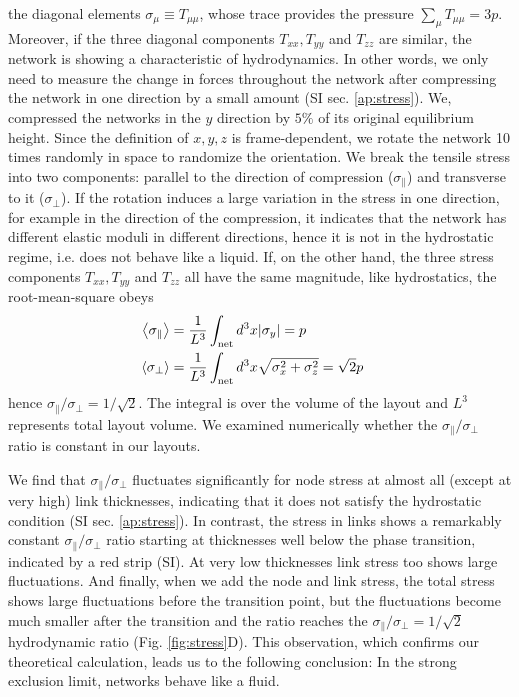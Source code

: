 \documentclass[nofootinbib,preprint,floatfix,titlepage,endfloats]{revtex4} %
\begin{document}
the  diagonal elements $ \sigma_\mu \equiv T_{\mu\mu}$, whose trace provides the pressure $\sum_\mu T_{\mu\mu} = 3p$. 
Moreover, if the three diagonal  components $T_{xx}, T_{yy}$ and $T_{zz}$ are similar, the network is showing a characteristic of hydrodynamics.
In other words, we only need to measure the change in forces throughout the network after compressing the network in one direction by a small amount (SI sec. \ref{ap:stress}). 
We, compressed the networks in the $y$ direction by $5\%$ 
of its original equilibrium height. 
Since the definition of $x,y,z$ is frame-dependent, we rotate the network 10 times randomly in space to randomize the orientation. 
We break the tensile stress into two components: parallel to the direction of compression ($\sigma_\parallel$) and transverse to it ($\sigma_\perp$). 
If the rotation induces a large variation in the stress in one direction, for example in the direction of the compression, it indicates that the network has different elastic moduli in different directions, hence it is not in the hydrostatic regime, i.e. does not behave like a liquid. 
If, on the other hand, the three stress components $T_{xx}, T_{yy}$ and $T_{zz}$ all have the same magnitude, like hydrostatics, the root-mean-square obeys
\begin{align}
\left<\sigma_\parallel\right> &={1\over L^3} \int_\mathrm{net} d^3x |\sigma_y| = p\cr
\left<\sigma_\perp\right> &= {1\over L^3} \int_\mathrm{net} d^3x \sqrt{\sigma_x^2+ \sigma_z^2} = \sqrt{2} p \label{eq:sigp}   
\end{align}
hence $ \sigma_\parallel/\sigma_\perp = 1/\sqrt{2}$. The integral is over the volume of the layout and $L^3$ represents total layout volume. 
We examined numerically whether the $ \sigma_\parallel/\sigma_\perp$ ratio is constant in our layouts.

We find that $\sigma_\parallel/\sigma_\perp$ fluctuates significantly for node stress at almost all (except at very high) link thicknesses, indicating that it does not satisfy the hydrostatic condition (SI sec. \ref{ap:stress}).
In contrast, the stress in links shows a remarkably constant  $\sigma_\parallel/\sigma_\perp$ ratio starting at thicknesses well below the phase transition, indicated by a red strip (SI). 
At very low thicknesses link stress too shows large fluctuations. 
And finally, when we add the node and link stress, the total stress shows large fluctuations before the transition point, but the fluctuations become much smaller after the transition and the ratio  reaches the $\sigma_\parallel/\sigma_\perp = 1/\sqrt{2}$ hydrodynamic ratio (Fig. \ref{fig:stress}D). This observation, which confirms our theoretical calculation, leads us to the following conclusion: In the strong exclusion limit, networks behave like a fluid. 
\end{document}
